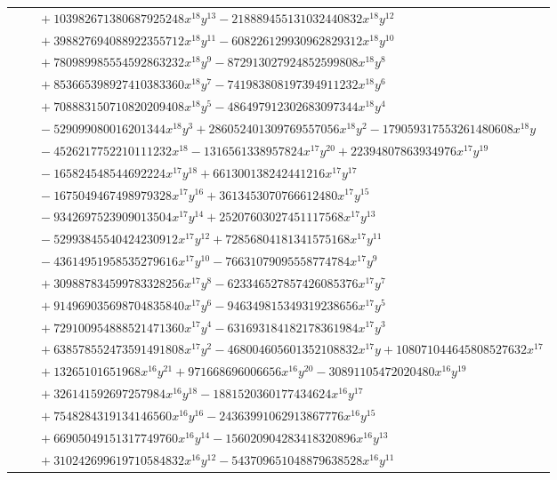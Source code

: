 \documentclass[11pt]{article}
\begin{document}
\begin{longtable}{@{}ll@{}}
 & $\quad +103982671380687925248x^{18}y^{13}-218889455131032440832x^{18}y^{12}$\\
 & $\quad +398827694088922355712x^{18}y^{11}-608226129930962829312x^{18}y^{10}$\\
 & $\quad +780989985554592863232x^{18}y^{9}-872913027924852599808x^{18}y^{8}$\\
 & $\quad +853665398927410383360x^{18}y^{7}-741983808197394911232x^{18}y^{6}$\\
 & $\quad +708883150710820209408x^{18}y^{5}-486497912302683097344x^{18}y^{4}$\\
 & $\quad -529099080016201344x^{18}y^{3}+286052401309769557056x^{18}y^{2}-179059317553261480608x^{18}y$\\
 & $\quad -4526217752210111232x^{18}-1316561338957824x^{17}y^{20}+22394807863934976x^{17}y^{19}$\\
 & $\quad -165824548544692224x^{17}y^{18}+661300138242441216x^{17}y^{17}$\\
 & $\quad -1675049467498979328x^{17}y^{16}+3613453070766612480x^{17}y^{15}$\\
 & $\quad -9342697523909013504x^{17}y^{14}+25207603027451117568x^{17}y^{13}$\\
 & $\quad -52993845540424230912x^{17}y^{12}+72856804181341575168x^{17}y^{11}$\\
 & $\quad -43614951958535279616x^{17}y^{10}-76631079095558774784x^{17}y^{9}$\\
 & $\quad +309887834599783328256x^{17}y^{8}-623346527857426085376x^{17}y^{7}$\\
 & $\quad +914969035698704835840x^{17}y^{6}-946349815349319238656x^{17}y^{5}$\\
 & $\quad +729100954888521471360x^{17}y^{4}-631693184182178361984x^{17}y^{3}$\\
 & $\quad +638578552473591491808x^{17}y^{2}-468004605601352108832x^{17}y+108071044645808527632x^{17}$\\
 & $\quad +13265101651968x^{16}y^{21}+971668696006656x^{16}y^{20}-30891105472020480x^{16}y^{19}$\\
 & $\quad +326141592697257984x^{16}y^{18}-1881520360177434624x^{16}y^{17}$\\
 & $\quad +7548284319134146560x^{16}y^{16}-24363991062913867776x^{16}y^{15}$\\
 & $\quad +66905049151317749760x^{16}y^{14}-156020904283418320896x^{16}y^{13}$\\
 & $\quad +310242699619710584832x^{16}y^{12}-543709651048879638528x^{16}y^{11}$\\

\end{longtable}
\end{document}
